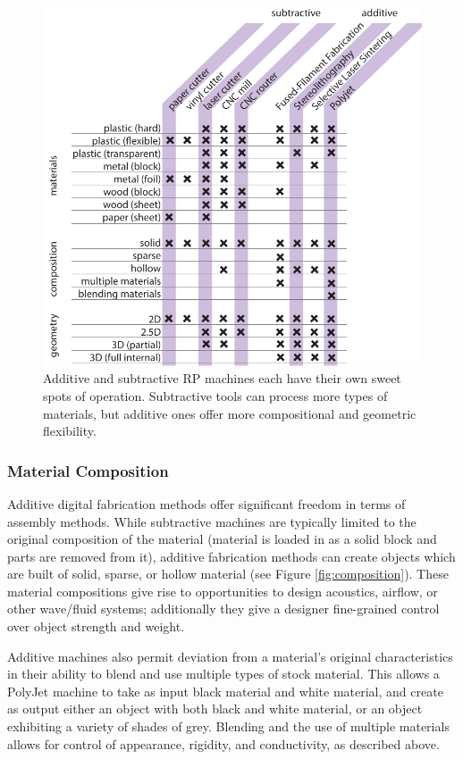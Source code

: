 \begin{figure}
\centering
\includegraphics[width=5in]{figures/materials-machines.pdf}
\caption{Additive and subtractive RP machines each have their own sweet spots of operation. Subtractive tools can process more types of materials, but additive ones offer more compositional and geometric flexibility.}
\label{table:materials-machines}
\end{figure}

\subsubsection{Material Composition}

Additive digital fabrication methods offer significant freedom in terms of assembly methods. While subtractive machines are typically limited to the original composition of the material (material is loaded in as a solid block and parts are removed from it), additive fabrication methods can create objects which are built of solid, sparse, or hollow material (see Figure \ref{fig:composition}). These material compositions give rise to opportunities to design acoustics, airflow, or other wave/fluid systems; additionally they give a designer fine-grained control over object strength and weight.

Additive machines also permit deviation from a material's original characteristics in their ability to blend and use multiple types of stock material. This allows a PolyJet machine to take as input black material and white material, and create as output either an object with both black and white material, or an object exhibiting a variety of shades of grey. Blending and the use of multiple materials allows for control of appearance, rigidity, and conductivity, as described above.


